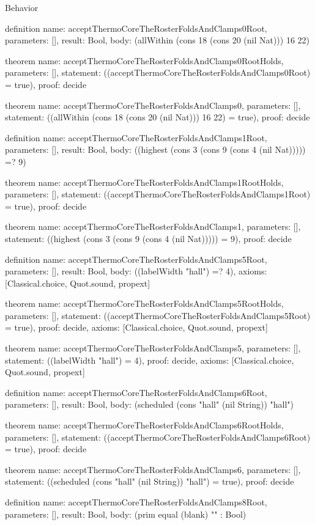\begin{lexlean}{Behavior}
\begin{semanticmodule}
definition{
  name: acceptThermoCoreTheRosterFoldsAndClamps0Root,
  parameters: [],
  result: Bool,
  body: (allWithin (cons 18 (cons 20 (nil Nat))) 16 22)
}

theorem{
  name: acceptThermoCoreTheRosterFoldsAndClamps0RootHolds,
  parameters: [],
  statement: ((acceptThermoCoreTheRosterFoldsAndClamps0Root) = true),
  proof: decide{}
}

theorem{
  name: acceptThermoCoreTheRosterFoldsAndClamps0,
  parameters: [],
  statement: ((allWithin (cons 18 (cons 20 (nil Nat))) 16 22) = true),
  proof: decide{}
}

definition{
  name: acceptThermoCoreTheRosterFoldsAndClamps1Root,
  parameters: [],
  result: Bool,
  body: ((highest (cons 3 (cons 9 (cons 4 (nil Nat))))) =? 9)
}

theorem{
  name: acceptThermoCoreTheRosterFoldsAndClamps1RootHolds,
  parameters: [],
  statement: ((acceptThermoCoreTheRosterFoldsAndClamps1Root) = true),
  proof: decide{}
}

theorem{
  name: acceptThermoCoreTheRosterFoldsAndClamps1,
  parameters: [],
  statement: ((highest (cons 3 (cons 9 (cons 4 (nil Nat))))) = 9),
  proof: decide{}
}

definition{
  name: acceptThermoCoreTheRosterFoldsAndClamps5Root,
  parameters: [],
  result: Bool,
  body: ((labelWidth "hall") =? 4),
  axioms: [Classical.choice, Quot.sound, propext]
}

theorem{
  name: acceptThermoCoreTheRosterFoldsAndClamps5RootHolds,
  parameters: [],
  statement: ((acceptThermoCoreTheRosterFoldsAndClamps5Root) = true),
  proof: decide{},
  axioms: [Classical.choice, Quot.sound, propext]
}

theorem{
  name: acceptThermoCoreTheRosterFoldsAndClamps5,
  parameters: [],
  statement: ((labelWidth "hall") = 4),
  proof: decide{},
  axioms: [Classical.choice, Quot.sound, propext]
}

definition{
  name: acceptThermoCoreTheRosterFoldsAndClamps6Root,
  parameters: [],
  result: Bool,
  body: (scheduled (cons "hall" (nil String)) "hall")
}

theorem{
  name: acceptThermoCoreTheRosterFoldsAndClamps6RootHolds,
  parameters: [],
  statement: ((acceptThermoCoreTheRosterFoldsAndClamps6Root) = true),
  proof: decide{}
}

theorem{
  name: acceptThermoCoreTheRosterFoldsAndClamps6,
  parameters: [],
  statement: ((scheduled (cons "hall" (nil String)) "hall") = true),
  proof: decide{}
}

definition{
  name: acceptThermoCoreTheRosterFoldsAndClamps8Root,
  parameters: [],
  result: Bool,
  body: (prim equal (blank) "" : Bool)
}


\end{semanticmodule}
\end{lexlean}
